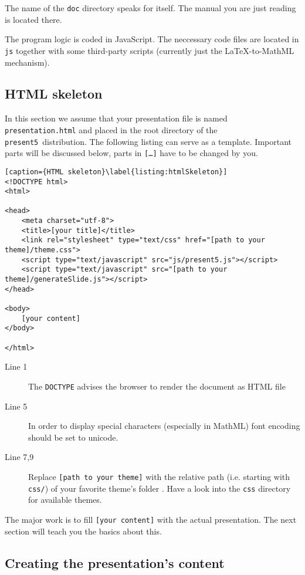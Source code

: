 \documentclass{scrartcl}
\newcommand{\present}{\code{present5}}
\newcommand{\code}[1]{{\tt #1}}
\begin{document}
The name of the \code{doc} directory speaks for itself. The manual you are just reading is located there.

The program logic is coded in JavaScript. The neccessary code files are located in \code{js} together with some third-party scripts (currently just the \LaTeX-to-MathML mechanism).


\subsection{HTML skeleton} 
\label{subsection:htmlSkeleton} 


In this section we assume that your presentation file is named \code{presentation.html} and placed in the root directory of the \present~distribution. The following listing can serve as a template. Important parts will be discussed below, parts in \code{[\ldots]} have to be changed by you.

\begin{lstlisting}[caption={HTML skeleton}\label{listing:htmlSkeleton}]
<!DOCTYPE html>
<html>

<head>
	<meta charset="utf-8">
	<title>[your title]</title>
	<link rel="stylesheet" type="text/css" href="[path to your theme]/theme.css">	
	<script type="text/javascript" src="js/present5.js"></script>
	<script type="text/javascript" src="[path to your theme]/generateSlide.js"></script>
</head>

<body>
	[your content]
</body>

</html>
\end{lstlisting}

\begin{description}
	\item[Line 1] The \code{DOCTYPE} advises the browser to render the document as HTML file
	\item[Line 5] In order to display special characters (especially in MathML) font encoding should be set to unicode.
	\item[Line 7,9] Replace \code{[path to your theme]} with the relative path (i.e. starting with \code{css/}) of your favorite theme's folder . Have a look into the \code{css} directory for available themes.
\end{description}

The major work is to fill \code{[your content]} with the actual presentation. The next section will teach you the basics about this.


\subsection{Creating the presentation's content}
\label{subsection:creatingPresentation}
\end{document}
